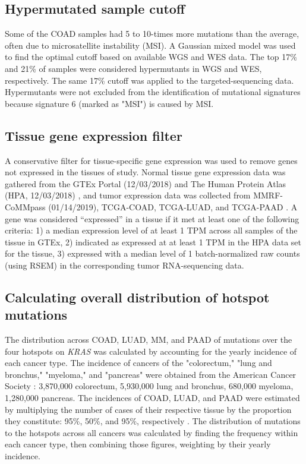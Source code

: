 \documentclass[english, 10pt, letterpaper]{article}
\newcommand{\KRAS}{\emph{KRAS}}
\begin{document}
\subsection*{Hypermutated sample cutoff}

Some of the COAD samples had 5 to 10-times more mutations than the average, often due to microsatellite instability (MSI). 
A Gaussian mixed model was used to find the optimal cutoff based on available WGS and WES data. 
The top 17\% and 21\% of samples were considered hypermutants in WGS and WES, respectively.
The same 17\% cutoff was applied to the targeted-sequencing data. 
Hypermutants were not excluded from the identification of mutational signatures because signature 6 (marked as "MSI") is caused by MSI.


\subsection*{Tissue gene expression filter}

A conservative filter for tissue-specific gene expression was used to remove genes not expressed in the tissues of study. 
Normal tissue gene expression data was gathered from the GTEx Portal (12/03/2018) \cite{GTExConsortium2017} and The Human Protein Atlas (HPA, 12/03/2018) \cite{Uhlen2015, Uhlen2016}, and tumor expression data was collected from MMRF-CoMMpass (01/14/2019), TCGA-COAD, TCGA-LUAD, and TCGA-PAAD \cite{Walker2019AAnalysis., CancerGenomeAtlasNetwork2012, CancerGenomeAtlasResearchNetwork2014, CancerGenomeAtlasResearchNetwork.Electronicaddress:andrew_aguirredfci.harvard.edu2017}. 
A gene was considered “expressed” in a tissue if it met at least one of the following criteria: 1) a median expression level of at least 1 TPM across all samples of the tissue in GTEx, 2) indicated as expressed at at least 1 TPM in the HPA data set for the tissue, 3) expressed with a median level of 1 batch-normalized raw counts (using RSEM) in the corresponding tumor RNA-sequencing data.


\subsection*{Calculating overall distribution of hotspot mutations}
The distribution across COAD, LUAD, MM, and PAAD of mutations over the four hotspots on \KRAS{} was calculated by accounting for the yearly incidence of each cancer type.
The incidence of cancers of the "colorectum," "lung and bronchus," "myeloma," and "pancreas" were obtained from the American Cancer Society \cite{Siegel2020Cancer2020.}: 3,870,000 colorectum, 5,930,000 lung and bronchus, 680,000 myeloma, 1,280,000 pancreas.
The incidences of COAD, LUAD, and PAAD were estimated by multiplying the number of cases of their respective tissue by the proportion they constitute: 95\%, 50\%, and 95\%, respectively \cite{Siegel2020Cancer2020., Meza2015Lung1973-2010.}.
The distribution of mutations to the hotspots across all cancers was calculated by finding the frequency within each cancer type, then combining those figures, weighting by their yearly incidence.
\end{document}
